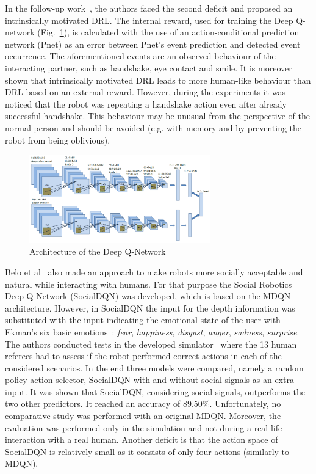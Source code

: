 \documentclass[thesis]{mas_proposal}
\begin{document}
In the follow-up work~\cite{Qureshi2018}, the authors faced the second deficit and proposed an intrinsically motivated DRL. The internal reward, used for training the Deep Q-network (Fig.~\ref{fig:mdqn}), is calculated with the use of an action-conditional prediction network (Pnet) as an error between Pnet's event prediction and detected event occurrence. The aforementioned events are an observed behaviour of the interacting partner, such as handshake, eye contact and smile. It is moreover shown that intrinsically motivated DRL leads to more human-like behaviour than DRL based on an external reward. However, during the experiments it was noticed that the robot was repeating a handshake action even after already successful handshake. This behaviour may be unusual from the perspective of the normal person and should be avoided (e.g. with memory and by preventing the robot from being oblivious).

\begin{figure}[th]
	\centering
	\includegraphics[width=0.7\textwidth]{architecture/mdqn.png}
	\caption{Architecture of the Deep Q-Network~\cite{Qureshi2018}}
	\label{fig:mdqn}
\end{figure}

Belo et al~\cite{Belo2022} also made an approach to make robots more socially acceptable and natural while interacting with humans. For that purpose the Social Robotics Deep Q-Network (SocialDQN) was developed, which is based on the MDQN architecture. However, in SocialDQN the input for the depth information was substituted with the input indicating the emotional state of the user with Ekman's six basic emotions~\cite{ekman1971constants}: \emph{fear}, \emph{happiness}, \emph{disgust}, \emph{anger}, \emph{sadness}, \emph{surprise}. The authors conducted tests in the developed simulator~\cite{Belo2021} where the 13 human referees had to assess if the robot performed correct actions in each of the considered scenarios. In the end three models were compared, namely a random policy action selector, SocialDQN with and without social signals as an extra input. It was shown that SocialDQN, considering social signals, outperforms the two other predictors. It reached an accuracy of 89.50\%. Unfortunately, no comparative study was performed with an original MDQN. Moreover, the evaluation was performed only in the simulation and not during a real-life interaction with a real human. Another deficit is that the action space of SocialDQN is relatively small as it consists of only four actions (similarly to MDQN).
 
\end{document}

